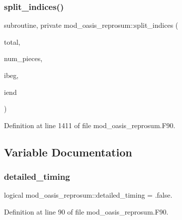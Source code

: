 \subsubsection{\texorpdfstring{split\+\_\+indices()}{split\_indices()}}
{\footnotesize\ttfamily subroutine, private mod\+\_\+oasis\+\_\+reprosum\+::split\+\_\+indices (\begin{DoxyParamCaption}\item[{integer, intent(in)}]{total,  }\item[{integer, intent(in)}]{num\+\_\+pieces,  }\item[{integer, dimension(num\+\_\+pieces), intent(out)}]{ibeg,  }\item[{integer, dimension(num\+\_\+pieces), intent(out)}]{iend }\end{DoxyParamCaption})\hspace{0.3cm}{\ttfamily [private]}}



Definition at line 1411 of file mod\+\_\+oasis\+\_\+reprosum.\+F90.



\subsection{Variable Documentation}
\mbox{\label{namespacemod__oasis__reprosum_a48a084c213295b9eaa78c0552a10741a}} 
\subsubsection{\texorpdfstring{detailed\+\_\+timing}{detailed\_timing}}
{\footnotesize\ttfamily logical mod\+\_\+oasis\+\_\+reprosum\+::detailed\+\_\+timing = .false.\hspace{0.3cm}{\ttfamily [private]}}



Definition at line 90 of file mod\+\_\+oasis\+\_\+reprosum.\+F90.

\mbox{\label{namespacemod__oasis__reprosum_a89140c250e34a903bc9aa546574988d6}} 
